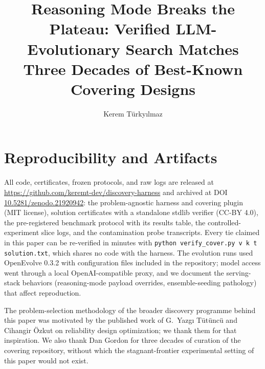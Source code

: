 \documentclass[acmsmall,screen,review]{acmart}
\title{Reasoning Mode Breaks the Plateau: Verified LLM-Evolutionary
       Search Matches Three Decades of Best-Known Covering Designs}
\author{Kerem T\"urky{\i}lmaz}
\affiliation{%
  \institution{Independent Researcher}
  \country{T\"urkiye}}
\begin{document}
\maketitle












\section*{Reproducibility and Artifacts}
All code, certificates, frozen protocols, and raw logs are released
at \url{https://github.com/keremt-dev/discovery-harness} and archived
at DOI \href{https://doi.org/10.5281/zenodo.21920942}%
{10.5281/zenodo.21920942}: the
problem-agnostic harness and covering plugin (MIT license), solution
certificates with a standalone stdlib verifier (CC-BY 4.0), the
pre-registered benchmark protocol with its results table, the
controlled-experiment slice logs, and the contamination probe
transcripts. Every tie claimed in this paper can be re-verified in
minutes with \texttt{python verify\_cover.py v k t solution.txt},
which shares no code with the harness. The evolution runs used
OpenEvolve 0.3.2 \cite{openevolve} with configuration files included
in the repository; model access went through a local
OpenAI-compatible proxy, and we document the serving-stack behaviors
(reasoning-mode payload overrides, ensemble-seeding pathology) that
affect reproduction.

\begin{acks}
The problem-selection methodology of the broader discovery programme
behind this paper was motivated by the published work of G.~Yazg{\i}
T\"ut\"unc\"u and Cihangir \"Ozkut on reliability design
optimization; we thank them for that inspiration. We also thank Dan
Gordon for three decades of curation of the covering repository,
without which the stagnant-frontier experimental setting of this
paper would not exist.
\end{acks}



\end{document}

